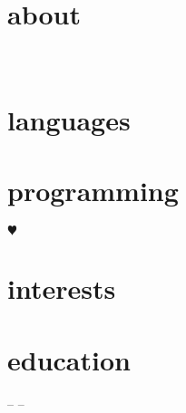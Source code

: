 \documentclass[]{friggeri-cv}
\begin{document}
\header{}{}
       {}


\begin{aside}
  \section{about}
    
    ~
    \href{mailto:}{}
    \href{}{}
  \section{languages}
    
  \section{programming}
    {\color{red} $\varheartsuit$} 
\end{aside}

\section{interests}



\section{education}

\begin{entrylist}
  \entry
    { – }
    {}
    {}
    {}
  \entry
    { – }
    {}
    {}
    {}
  \end{entrylist}






\end{document}
